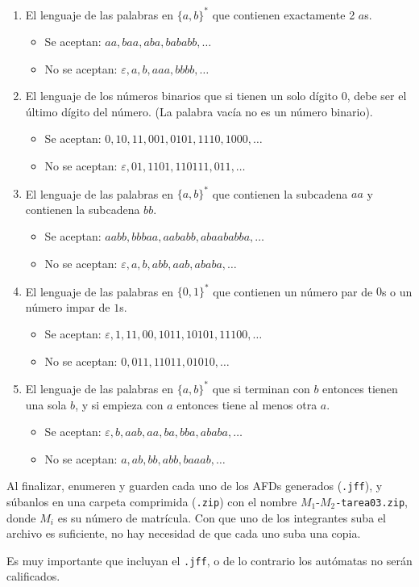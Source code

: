 \documentclass[]{book}
\theoremstyle{definition}
\begin{document}
\begin{enumerate}
	\itemsep3.5ex
	\item El lenguaje de las palabras en $\{a,b\}^*$ que contienen exactamente 2 $a$s.
	\begin{itemize}
		\item Se aceptan: $aa, baa, aba, bababb, \dots$
		\item No se aceptan: $\varepsilon , a, b, aaa, bbbb, \dots$
	\end{itemize}
	
	\item El lenguaje de los números binarios que si tienen un solo dígito $0$, debe ser el último dígito del número. (La palabra vacía no es un número binario).
	\begin{itemize}
		\item Se aceptan: $0, 10, 11, 001, 0101, 1110, 1000, \dots$
		\item No se aceptan: $\varepsilon , 01, 1101, 110111, 011, \dots$
	\end{itemize}

	\item El lenguaje de las palabras en $\{a, b\}^*$ que contienen la subcadena $aa$ y contienen la subcadena $bb$.
	\begin{itemize}
		\item Se aceptan: $aabb, bbbaa, aababb, abaababba, \dots$
		\item No se aceptan: $\varepsilon , a, b, abb, aab, ababa, \dots$
	\end{itemize}

	\item El lenguaje de las palabras en $\{0,1 \}^*$ que contienen un número par de $0$s o un número impar de $1$s.
	\begin{itemize}
		\item Se aceptan: $\varepsilon , 1, 11, 00, 1011, 10101, 11100, \dots$
		\item No se aceptan: $0, 011, 11011, 01010, \dots$
	\end{itemize}

	\item El lenguaje de las palabras en $\{a, b\}^*$ que si terminan con $b$ entonces tienen una sola $b$, y si empieza con $a$ entonces tiene al menos otra $a$.
	\begin{itemize}
		\item Se aceptan: $\varepsilon , b, aab, aa, ba, bba, ababa, \dots$
		\item No se aceptan: $a, ab, bb, abb, baaab, \dots$
	\end{itemize}
\end{enumerate}

Al finalizar, enumeren y guarden cada uno de los AFDs generados (\texttt{.jff}), y súbanlos en una carpeta comprimida (\texttt{.zip}) con el nombre $M_1$-$M_2$\texttt{-tarea03.zip}, donde $M_i$ es su número de matrícula.
Con que uno de los integrantes suba el archivo es suficiente, no hay necesidad de que cada uno suba una copia.

Es muy importante que incluyan el \texttt{.jff}, o de lo contrario los autómatas no serán calificados.
\end{document}
